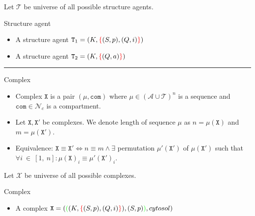 \documentclass[12pt]{fithesis2}
\begin{document}
\begin{notation}
Let $\mathcal{T}$ be universe of all possible structure agents.
\end{notation}

\begin{example}{Structure agent}\label{example:structure}

\begin{itemize}
\item A structure agent $\mathtt{T}_1 = (K, \textcolor{red}{\{}(S, p), (Q, i)\textcolor{red}{\}})$
\item A structure agent $\mathtt{T}_2 = (K, \textcolor{red}{\{}(Q, a)\textcolor{red}{\}})$
\end{itemize}
\end{example}

\noindent\rule{\textwidth}{1pt}

\begin{definition}{Complex}

\begin{itemize}
\item Complex $\mathtt{X}$ is a pair $(\mu, \mathtt{com})$ where $\mu \in (\mathcal{A} \cup \mathcal{T})^n$ is a sequence and $\mathtt{com} \in \mathcal{N}_{c}$ is a compartment.

\item Let $\mathtt{X}, \mathtt{X}'$ be complexes. We denote length of sequence $\mu$ as $n = \mu(\mathtt{X})$ and $m = \mu(\mathtt{X}')$. 

\item Equivalence: $\mathtt{X} \equiv \mathtt{X}' \Leftrightarrow n \equiv m \wedge \exists $ permutation $ \mu'(\mathtt{X}')$ of $\mu(\mathtt{X}')$ such that $\forall i~\in~[1,~n]: \mu(\mathtt{X})_i \equiv \mu'(\mathtt{X}')_i$.
\end{itemize}
\end{definition}

\begin{notation}
Let $\mathcal{X}$ be universe of all possible complexes.
\end{notation}


\begin{example}{Complex}\label{example:complex}

\begin{itemize}
\item A complex $\mathtt{X} = (\textcolor{green}{(}(K, \textcolor{red}{\{}(S, p), (Q, i)\textcolor{red}{\}}), (S, p)\textcolor{green}{)}, cytosol)$
\end{itemize}
\end{example}
\end{document}
